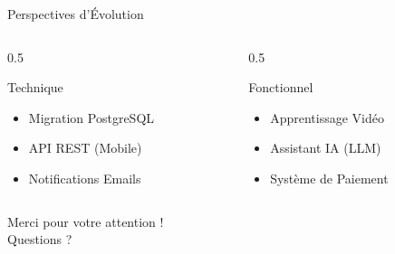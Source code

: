 \documentclass[10pt]{beamer}
\begin{document}
\begin{frame}{Perspectives d'\'{E}volution}
    \begin{columns}[T]
        \begin{column}{0.5\textwidth}
            \begin{block}{Technique}
                \begin{itemize}
                    \item Migration PostgreSQL
                    \item API REST (Mobile)
                    \item Notifications Emails
                \end{itemize}
            \end{block}
        \end{column}
        \begin{column}{0.5\textwidth}
            \begin{block}{Fonctionnel}
                \begin{itemize}
                    \item Apprentissage Vid\'{e}o
                    \item Assistant IA (LLM)
                    \item Syst\`{e}me de Paiement
                \end{itemize}
            \end{block}
        \end{column}
    \end{columns}
\end{frame}

\begin{frame}
    \centering
    \Huge \textcolor{EMSIGreen}{Merci pour votre attention !} \\
    \bigskip
    \normalsize Questions ?
\end{frame}
\end{document}
